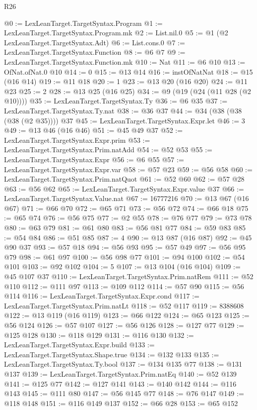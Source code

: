 \begin{lexlean}{R26}
\begin{coremodule}
@0 := LexLeanTarget.TargetSyntax.Program
@1 := LexLeanTarget.TargetSyntax.Program.mk
@2 := List.nil.{0}
@5 := @1 (@2 LexLeanTarget.TargetSyntax.Adt)
@6 := List.cons.{0}
@7 := LexLeanTarget.TargetSyntax.Function
@8 := @6 @7
@9 := LexLeanTarget.TargetSyntax.Function.mk
@10 := Nat
@11 := @6 @10
@13 := OfNat.ofNat.{0} @10
@14 := 0
@15 := @13 @14
@16 := instOfNatNat
@18 := @15 (@16 @14)
@19 := @11 @18
@20 := 1
@23 := @13 @20 (@16 @20)
@24 := @11 @23
@25 := 2
@28 := @13 @25 (@16 @25)
@34 := @9 (@19 (@24 (@11 @28 (@2 @10))))
@35 := LexLeanTarget.TargetSyntax.Ty
@36 := @6 @35
@37 := LexLeanTarget.TargetSyntax.Ty.nat
@38 := @36 @37
@44 := @34 (@38 (@38 (@38 (@2 @35)))) @37
@45 := LexLeanTarget.TargetSyntax.Expr.let
@46 := 3
@49 := @13 @46 (@16 @46)
@51 := @45 @49 @37
@52 := LexLeanTarget.TargetSyntax.Expr.prim
@53 := LexLeanTarget.TargetSyntax.Prim.natAdd
@54 := @52 @53
@55 := LexLeanTarget.TargetSyntax.Expr
@56 := @6 @55
@57 := LexLeanTarget.TargetSyntax.Expr.var
@58 := @57 @23
@59 := @56 @58
@60 := LexLeanTarget.TargetSyntax.Prim.natQuot
@61 := @52 @60
@62 := @57 @28
@63 := @56 @62
@65 := LexLeanTarget.TargetSyntax.Expr.value @37
@66 := LexLeanTarget.TargetSyntax.Value.nat
@67 := 16777216
@70 := @13 @67 (@16 @67)
@71 := @66 @70
@72 := @65 @71
@73 := @56 @72
@74 := @66 @18
@75 := @65 @74
@76 := @56 @75
@77 := @2 @55
@78 := @76 @77
@79 := @73 @78
@80 := @63 @79
@81 := @61 @80
@83 := @56 @81 @77
@84 := @59 @83
@85 := @54 @84
@86 := @51 @85
@87 := 4
@90 := @13 @87 (@16 @87)
@92 := @45 @90 @37
@93 := @57 @18
@94 := @56 @93
@95 := @57 @49
@97 := @56 @95 @79
@98 := @61 @97
@100 := @56 @98 @77
@101 := @94 @100
@102 := @54 @101
@103 := @92 @102
@104 := 5
@107 := @13 @104 (@16 @104)
@109 := @45 @107 @37
@110 := LexLeanTarget.TargetSyntax.Prim.natRem
@111 := @52 @110
@112 := @111 @97
@113 := @109 @112
@114 := @57 @90
@115 := @56 @114
@116 := LexLeanTarget.TargetSyntax.Expr.cond
@117 := LexLeanTarget.TargetSyntax.Prim.natLt
@118 := @52 @117
@119 := 8388608
@122 := @13 @119 (@16 @119)
@123 := @66 @122
@124 := @65 @123
@125 := @56 @124
@126 := @57 @107
@127 := @56 @126
@128 := @127 @77
@129 := @125 @128
@130 := @118 @129
@131 := @116 @130
@132 := LexLeanTarget.TargetSyntax.Expr.build
@133 := LexLeanTarget.TargetSyntax.Shape.true
@134 := @132 @133
@135 := LexLeanTarget.TargetSyntax.Ty.bool
@137 := @134 @135 @77
@138 := @131 @137
@139 := LexLeanTarget.TargetSyntax.Prim.natEq
@140 := @52 @139
@141 := @125 @77
@142 := @127 @141
@143 := @140 @142
@144 := @116 @143
@145 := @111 @80
@147 := @56 @145 @77
@148 := @76 @147
@149 := @118 @148
@151 := @116 @149 @137
@152 := @66 @28
@153 := @65 @152

\end{coremodule}
\end{lexlean}
